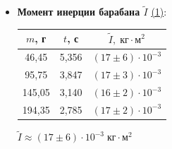 \documentclass{article}
\begin{document}
\begin{itemize}
\begin{itemize}
$$ m_0=-\frac{b}{k}$$

 \begin{equation*}
	\fbox{$ m_0= ({-}8\pm18)\cdot10^{-3}\;\mbox{кг}$}
\end{equation*}
По \hyperlink{formuls}{формуле (4)}:\\

$M_{\mbox{сопр.}}= ({-}2\pm6)\cdot10^{-3}\;\;\mbox{Н}\cdot\mbox{м}$
\end{itemize}
\item {\bf Момент инерции барабана $\tilde{I}$} \hyperlink{formuls}{(1)}:\\

\begin{tabular}{c|c||c||}
	
	$m$, г& $t$, с &$\tilde I{,}\;\mbox{кг}\cdot\mbox{м}^2$\\
	\hline
	46,45& 5,356& $(17\pm6)\cdot10^{-3}$\\
	
	95,75& 3,847 &$(17\pm3)\cdot10^{-3}$\\
	
	145,05& 3,140& $(16\pm2)\cdot10^{-3}$\\
	
	194,35& 2,785& $(17\pm2)\cdot10^{-3}$\\
\end{tabular}

$\tilde{I}\approx(17\pm6)\cdot10^{-3}\;\mbox{кг}\cdot\mbox{м}^2$
\end{itemize}
\end{document}
